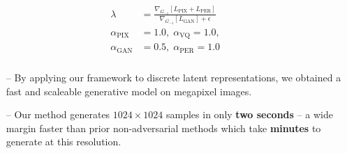 \documentclass[14pt,margin=0.5in,innermargin=0in,blockverticalspace=-0.1in,colspace=-1.2cm]{tikzposter}
\begin{document}
\begin{columns}
{\begin{tcolorbox}[boxsep=0pt,top=0cm,bottom=0.0cm,adjusted title={\huge\bf Proposed Method},colbacktitle=colorOne]
{\begin{minipage}{0.49\linewidth}
\begin{align*}
            \begin{split}
                \lambda &= \frac{\nabla_{G_{-1}}[L_\text{PIX} +
                L_\text{PER}]}{\nabla_{G_{-1}}[L_\text{GAN}] + \epsilon}\\
                \alpha_\text{PIX} &= 1.0,\; \alpha_\text{VQ} = 1.0,\\
                \alpha_\text{GAN} &= 0.5,\; \alpha_\text{PER} = 1.0 \\
            \end{split}
            \end{align*}
        \end{minipage}
            }
        \vspace{0.4cm}
        {
        \Large
        \begin{itemize}
            \item[--] By applying our framework to discrete latent
                representations, we obtained a fast and scaleable generative
                model on megapixel images.
            \item[--] Our method generates $1024 \times 1024$ samples in only
                \textbf{two seconds} -- a wide margin faster than prior non-adversarial
                methods which take \textbf{minutes} to generate at this resolution.
        \end{itemize}
        }


\end{tcolorbox}}
\end{columns}
\end{document}
